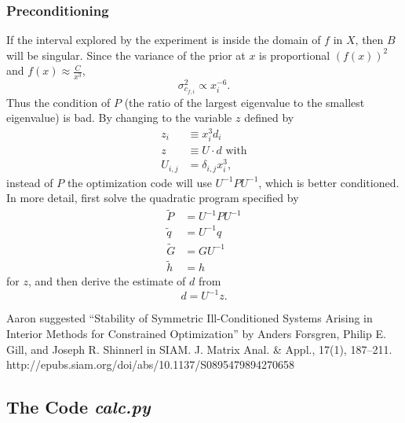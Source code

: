 \documentclass[11pt]{article}
\begin{document}
\subsubsection{Preconditioning}
\label{sec:preconditioning}

If the interval explored by the experiment is inside the domain of $f$
in $X$, then $B$ will be singular.  Since the variance of the prior at
$x$ is proportional $(f(x))^2$ and $f(x) \approx \frac{C}{x^3}$,
\begin{equation}
  \label{eq:var_f}
  \sigma^2_{c_{f,i}} \propto x_i^{-6}.
\end{equation}
Thus the condition of $P$ (the ratio of the largest eigenvalue to the
smallest eigenvalue) is bad.  By changing to the variable $z$ defined
by
\begin{align*}
  z_i &\equiv x_i^3 d_i \\
  z &\equiv U \cdot d \text{ with} \\
  U_{i,j} &= \delta_{i,j} x_i^3,
\end{align*}
\newcommand{\UI}{U^{-1}}
instead of $P$ the optimization code will use $\UI P \UI$, which
is better conditioned.  In more detail, first solve the quadratic
program specified by
\begin{align*}
  \tilde P &= \UI P \UI \\
  \tilde q &= \UI q \\
  \tilde G &= G \UI \\
  \tilde h &= h
\end{align*}
for $z$, and then derive the estimate of $d$ from
\begin{equation*}
  d = \UI z.
\end{equation*}



Aaron suggested ``Stability of Symmetric Ill-Conditioned Systems
Arising in Interior Methods for Constrained Optimization'' by Anders
Forsgren, Philip E. Gill, and Joseph R. Shinnerl in SIAM. J. Matrix
Anal. \& Appl., 17(1),
187–211. http://epubs.siam.org/doi/abs/10.1137/S0895479894270658

\subsection{The Code \emph{calc.py}}
\label{sec:code}
\end{document}
